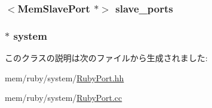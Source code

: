 \label{classRubyPort_a90d108bebdfeb2310e9a40b66b22f429}
\hypertarget{classRubyPort_ac00171ae3169a04dcc3119647b11711f}{
\subsubsection[{slave\_\-ports}]{$<${\bf MemSlavePort} $\ast$$>$ {\bf slave\_\-ports}}}
\label{classRubyPort_ac00171ae3169a04dcc3119647b11711f}
\hypertarget{classRubyPort_af27ccd765f13a4b7bd119dc7579e2746}{
\subsubsection[{system}]{$\ast$ {\bf system}}}
\label{classRubyPort_af27ccd765f13a4b7bd119dc7579e2746}


このクラスの説明は次のファイルから生成されました:\begin{DoxyCompactItemize}
\item 
mem/ruby/system/\hyperlink{RubyPort_8hh}{RubyPort.hh}\item 
mem/ruby/system/\hyperlink{RubyPort_8cc}{RubyPort.cc}\end{DoxyCompactItemize}
